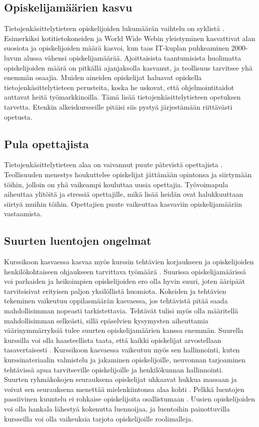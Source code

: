 \documentclass[finnish]{tktltiki2}
\theoremstyle{definition}
\theoremstyle{remark}
\begin{document}
\subsection{Opiskelijamäärien kasvu}
Tietojenkäsittelytieteen opiskelijoiden lukumäärän vaihtelu on syklistä \cite{Roberts11}. Esimerkiksi kotitietokoneiden ja World Wide Webin yleistyminen kasvattivat alan suosiota ja opiskelijoiden määrä kasvoi, kun taas IT-kuplan puhkeaminen 2000-luvun alussa vähensi opiskelijamäärää. Ajoittaisista taantumisista huolimatta opiskelijoiden määrä on pitkällä ajanjaksolla kasvanut, ja teollisuus tarvitsee yhä enemmän osaajia. Muiden aineiden opiskelijat haluavat opiskella tietojenkäsittelytieteen perusteita, koska he uskovat, että ohjelmointitaidot auttavat heitä työmarkkinoilla. Tämä lisää tietojenkäsittelytieteen opetuksen tarvetta. Etenkin alkeiskursseille pitäisi siis pystyä järjestämään riittävästi opetusta. 

\subsection{Pula opettajista}
Tietojenkäsittelytieteen alaa on vaivannut puute pätevistä opettajista \cite{Roberts99}. Teollisuuden menestys houkuttelee opiskelijat jättämään opintonsa ja siirtymään töihin, jolloin on yhä vaikeampi kouluttaa uusia opettajia. Työvoimapula aiheuttaa ylitöitä ja stressiä opettajille, mikä lisää heidän ovat halukkuuttaan siirtyä muihin töihin. Opettajien puute vaikeuttaa kasvaviin opiskelijamääriin vastaamista.

\subsection{Suurten luentojen ongelmat}

Kurssikoon kasvaessa kasvaa myös kurssin tehtävien korjaukseen ja opiskelijoiden henkilökohtaiseen ohjaukseen tarvittava työmäärä \cite{Kay98}. Suurissa opiskelijamäärissä voi parhaiden ja heikoimpien opiskelijoiden ero olla hyvin suuri, joten ääripäät tarvitsisivat erityisen paljon yksilöllistä huomiota. Kokeiden ja tehtävien tekeminen vaikeutuu oppilasmäärän kasvaessa, jos tehtävistä pitää saada mahdollisimman nopeasti tarkistettavia. Tehtävät tulisi myös olla määritellä mahdollisimman selkeästi, sillä epäselvien kysymysten aiheuttamia väärinymmärryksiä tulee suurten opiskelijamäärien kanssa enemmän. Suurella kurssilla voi olla haasteellista taata, että kaikki opiskelijat arvostellaan tasavertaisesti \cite{Charmillard02}. Kurssikoon kasvaessa vaikeutuu myös sen hallinnointi, kuten kurssinateriaalin valmistelu ja jakaminen opiskelijoille, neuvonnan tarjoaminen tehtävissä apua tarvitseville opiskelijoille ja henkilökunnan hallinnointi.
\\
Suurten ryhmäkokojen seurauksena opiskelijat uhkaavat hukkua massaan ja voivat sen seurauksena menettää mielenkiintonsa alaa kohti \cite{Kay98}. Pelkkä luentojen passiivinen kuuntelu ei rohkaise opiskelijoita osallistumaan \cite{Kopp00}. Uusien opiskelijoiden voi olla hankala lähestyä kokenutta luennoijaa, ja luentoihin painottuvilla kursseilla voi olla vaikeuksia tarjota opiskelijoille roolimalleja.   
\end{document}
